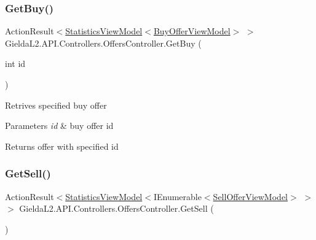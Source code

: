 \subsubsection{\texorpdfstring{GetBuy()}{GetBuy()}\hspace{0.1cm}{\footnotesize\ttfamily [2/2]}}
{\footnotesize\ttfamily Action\+Result$<$\mbox{\hyperlink{class_gielda_l2_1_1_a_p_i_1_1_view_models_1_1_view_1_1_statistics_view_model}{Statistics\+View\+Model}}$<$\mbox{\hyperlink{class_gielda_l2_1_1_a_p_i_1_1_view_models_1_1_view_1_1_buy_offer_view_model}{Buy\+Offer\+View\+Model}}$>$ $>$ Gielda\+L2.\+A\+P\+I.\+Controllers.\+Offers\+Controller.\+Get\+Buy (\begin{DoxyParamCaption}\item[{int}]{id }\end{DoxyParamCaption})}



Retrives specified buy offer 


\begin{DoxyParams}{Parameters}
{\em id} & buy offer id\\
\hline
\end{DoxyParams}
\begin{DoxyReturn}{Returns}
offer with specified id
\end{DoxyReturn}
\mbox{\label{class_gielda_l2_1_1_a_p_i_1_1_controllers_1_1_offers_controller_a9ac2f421d868e7f0583c2b43368b5a28}} 
\subsubsection{\texorpdfstring{GetSell()}{GetSell()}\hspace{0.1cm}{\footnotesize\ttfamily [1/2]}}
{\footnotesize\ttfamily Action\+Result$<$\mbox{\hyperlink{class_gielda_l2_1_1_a_p_i_1_1_view_models_1_1_view_1_1_statistics_view_model}{Statistics\+View\+Model}}$<$I\+Enumerable$<$\mbox{\hyperlink{class_gielda_l2_1_1_a_p_i_1_1_view_models_1_1_view_1_1_sell_offer_view_model}{Sell\+Offer\+View\+Model}}$>$ $>$ $>$ Gielda\+L2.\+A\+P\+I.\+Controllers.\+Offers\+Controller.\+Get\+Sell (\begin{DoxyParamCaption}{ }\end{DoxyParamCaption})}



